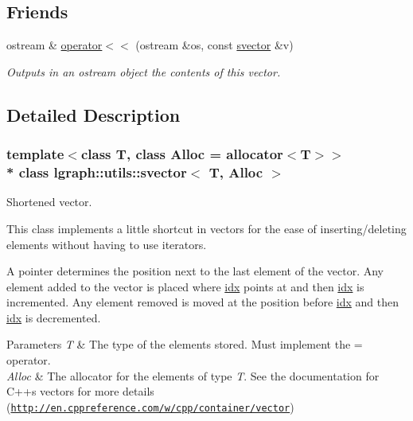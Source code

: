 \subsection*{Friends}
\begin{DoxyCompactItemize}
\item 
ostream \& \hyperlink{classlgraph_1_1utils_1_1svector_a57b29ed979371b1ad0a9ba9932f6531c}{operator$<$$<$} (ostream \&os, const \hyperlink{classlgraph_1_1utils_1_1svector}{svector} \&v)
\begin{DoxyCompactList}\small\item\em Outputs in an ostream object the contents of this vector. \end{DoxyCompactList}\end{DoxyCompactItemize}


\subsection{Detailed Description}
\subsubsection*{template$<$class T, class Alloc = allocator$<$\+T$>$$>$\\*
class lgraph\+::utils\+::svector$<$ T, Alloc $>$}

Shortened vector. 

This class implements a little shortcut in vectors for the ease of inserting/deleting elements without having to use iterators.

A pointer determines the position next to the last element of the vector. Any element added to the vector is placed where \hyperlink{classlgraph_1_1utils_1_1svector_a7ef963c079c7dc8a6a559ceef81a241f}{idx} points at and then \hyperlink{classlgraph_1_1utils_1_1svector_a7ef963c079c7dc8a6a559ceef81a241f}{idx} is incremented. Any element removed is moved at the position before \hyperlink{classlgraph_1_1utils_1_1svector_a7ef963c079c7dc8a6a559ceef81a241f}{idx} and then \hyperlink{classlgraph_1_1utils_1_1svector_a7ef963c079c7dc8a6a559ceef81a241f}{idx} is decremented.


\begin{DoxyParams}{Parameters}
{\em T} & The type of the elements stored. Must implement the \textquotesingle{}=\textquotesingle{} operator. \\
\hline
{\em Alloc} & The allocator for the elements of type {\itshape T}. See the documentation for C++\textquotesingle{}s vectors for more details (\href{http://en.cppreference.com/w/cpp/container/vector}{\tt http\+://en.\+cppreference.\+com/w/cpp/container/vector}) \\
\hline
\end{DoxyParams}


